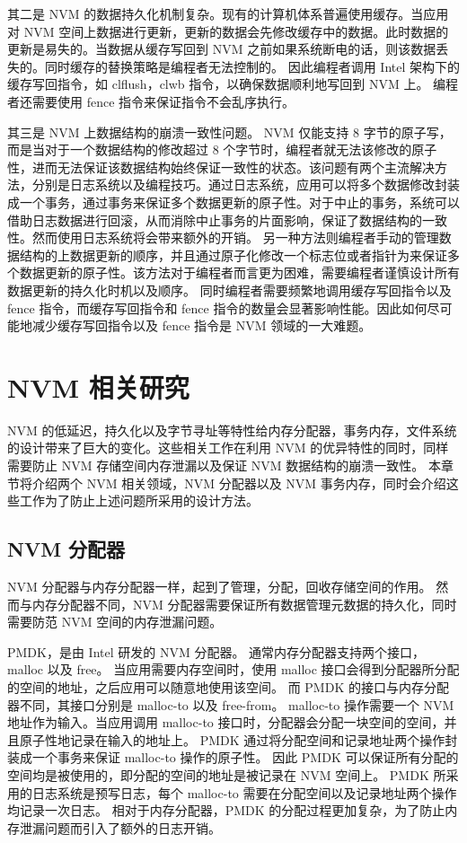 其二是 NVM 的数据持久化机制复杂。现有的计算机体系普遍使用缓存。当应用对 NVM 空间上数据进行更新，更新的数据会先修改缓存中的数据。此时数据的更新是易失的。当数据从缓存写回到 NVM 之前如果系统断电的话，则该数据丢失的。同时缓存的替换策略是编程者无法控制的。
因此编程者调用 Intel 架构下的缓存写回指令，如 clflush，clwb 指令，以确保数据顺利地写回到 NVM 上。
编程者还需要使用 fence 指令来保证指令不会乱序执行。

其三是 NVM 上数据结构的崩溃一致性问题。
NVM 仅能支持 8 字节的原子写，而是当对于一个数据结构的修改超过 8 个字节时，编程者就无法该修改的原子性，进而无法保证该数据结构始终保证一致性的状态。该问题有两个主流解决方法，分别是日志系统以及编程技巧。通过日志系统，应用可以将多个数据修改封装成一个事务，通过事务来保证多个数据更新的原子性。对于中止的事务，系统可以借助日志数据进行回滚，从而消除中止事务的片面影响，保证了数据结构的一致性。然而使用日志系统将会带来额外的开销。
另一种方法则编程者手动的管理数据结构的上数据更新的顺序，并且通过原子化修改一个标志位或者指针为来保证多个数据更新的原子性。该方法对于编程者而言更为困难，需要编程者谨慎设计所有数据更新的持久化时机以及顺序。
同时编程者需要频繁地调用缓存写回指令以及 fence 指令，而缓存写回指令和 fence 指令的数量会显著影响性能。因此如何尽可能地减少缓存写回指令以及 fence 指令是 NVM 领域的一大难题。

\section{NVM 相关研究}

NVM 的低延迟，持久化以及字节寻址等特性给内存分配器，事务内存，文件系统的设计带来了巨大的变化。这些相关工作在利用 NVM 的优异特性的同时，同样需要防止 NVM 存储空间内存泄漏以及保证 NVM 数据结构的崩溃一致性。
本章节将介绍两个 NVM 相关领域，NVM 分配器以及 NVM 事务内存，同时会介绍这些工作为了防止上述问题所采用的设计方法。

\subsection{NVM 分配器}

NVM 分配器与内存分配器一样，起到了管理，分配，回收存储空间的作用。
然而与内存分配器不同，NVM 分配器需要保证所有数据管理元数据的持久化，同时需要防范 NVM 空间的内存泄漏问题。

PMDK，是由 Intel 研发的 NVM 分配器\cite{pmdk}。
通常内存分配器支持两个接口，malloc 以及 free。
当应用需要内存空间时，使用 malloc 接口会得到分配器所分配的空间的地址，之后应用可以随意地使用该空间。
而 PMDK 的接口与内存分配器不同，其接口分别是 malloc-to 以及 free-from。
malloc-to 操作需要一个 NVM 地址作为输入。当应用调用 malloc-to 接口时，分配器会分配一块空间的空间，并且原子性地记录在输入的地址上。
PMDK 通过将分配空间和记录地址两个操作封装成一个事务来保证 malloc-to 操作的原子性。
因此 PMDK 可以保证所有分配的空间均是被使用的，即分配的空间的地址是被记录在 NVM 空间上。
PMDK 所采用的日志系统是预写日志，每个 malloc-to 需要在分配空间以及记录地址两个操作均记录一次日志。
相对于内存分配器，PMDK 的分配过程更加复杂，为了防止内存泄漏问题而引入了额外的日志开销。


